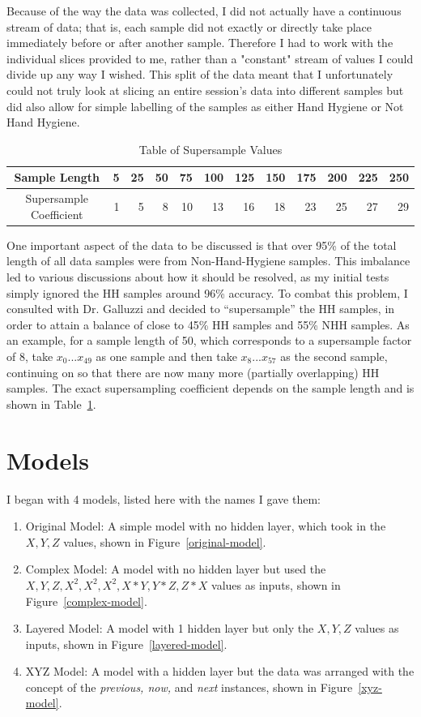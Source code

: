 \documentclass[]{report}
\begin{document}
Because of the way the data was collected, I did not actually have a continuous stream of data; that is, each sample did not exactly or directly take place immediately before or after another sample. Therefore I had to work with the individual slices provided to me, rather than a "constant" stream of values I could divide up any way I wished. This split of the data meant that I unfortunately could not truly look at slicing an entire session's data into different samples but did also allow for simple labelling of the samples as either Hand Hygiene or Not Hand Hygiene.

\begin{table}
	\centering
	\label{supersamples}
	\begin{tabular}{|c|r|r|r|r|r|r|r|r|r|r|r|}
		\hline
		Sample Length          & 5 & 25 & 50 & 75 & 100 & 125 & 150 & 175 & 200 & 225 & 250 \\
		\hline
		Supersample Coefficient & 1 & 5  & 8  & 10 & 13 & 16  & 18  & 23  & 25  & 27  & 29 \\
		\hline
	\end{tabular}
	\caption{Table of Supersample Values}
\end{table}

One important aspect of the data to be discussed is that over 95\% of the total length of all data samples were from Non-Hand-Hygiene samples. This imbalance led to various discussions about how it should be resolved, as my initial tests simply ignored the HH samples around 96\% accuracy. To combat this problem, I consulted with Dr. Galluzzi and decided to ``supersample'' the HH samples, in order to attain a balance of close to 45\% HH samples and 55\% NHH samples. As an example, for a sample length of 50, which corresponds to a supersample factor of 8, take $x_{0} ... x_{49}$ as one sample and then take $x_{8} ... x_{57}$ as the second sample, continuing on so that there are now many more (partially overlapping) HH samples. The exact supersampling coefficient depends on the sample length and is shown in Table~\ref{supersamples}.

\section{Models}\label{models}

I began with 4 models, listed here with the names I gave them:
\begin{enumerate}
	\item Original Model: A simple model with no hidden layer, which took in the $X,Y,Z$ values, shown in Figure~\ref{original-model}.
	\item Complex Model: A model with no hidden layer but used the $X,Y,Z,X^{2},X^{2},X^{2},X*Y,Y*Z,Z*X$ values as inputs, shown in Figure~\ref{complex-model}.
	\item Layered Model: A model with 1 hidden layer but only the $X,Y,Z$ values as inputs, shown in Figure~\ref{layered-model}.
	\item XYZ Model: A model with a hidden layer but the data was arranged with the concept of the \textit{previous, now,} and \textit{next} instances, shown in Figure~\ref{xyz-model}.
\end{enumerate}
\end{document}
